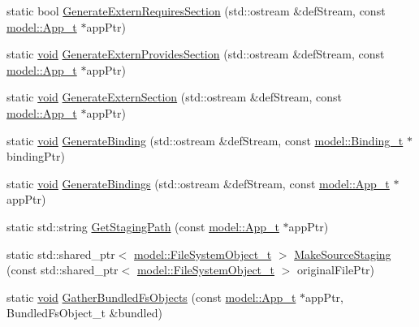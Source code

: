 \begin{DoxyCompactItemize}
\item 
static bool \hyperlink{namespaceadef_gen_abf01ac57a60677828d48fc6922b244d4}{Generate\+Extern\+Requires\+Section} (std\+::ostream \&def\+Stream, const \hyperlink{structmodel_1_1_app__t}{model\+::\+App\+\_\+t} $\ast$app\+Ptr)
\item 
static \hyperlink{_t_e_m_p_l_a_t_e__cdef_8h_ac9c84fa68bbad002983e35ce3663c686}{void} \hyperlink{namespaceadef_gen_aa4781df965e05e2e86f10e072392e974}{Generate\+Extern\+Provides\+Section} (std\+::ostream \&def\+Stream, const \hyperlink{structmodel_1_1_app__t}{model\+::\+App\+\_\+t} $\ast$app\+Ptr)
\item 
static \hyperlink{_t_e_m_p_l_a_t_e__cdef_8h_ac9c84fa68bbad002983e35ce3663c686}{void} \hyperlink{namespaceadef_gen_ab0ee056bd661f18f3481891bab37b5de}{Generate\+Extern\+Section} (std\+::ostream \&def\+Stream, const \hyperlink{structmodel_1_1_app__t}{model\+::\+App\+\_\+t} $\ast$app\+Ptr)
\item 
static \hyperlink{_t_e_m_p_l_a_t_e__cdef_8h_ac9c84fa68bbad002983e35ce3663c686}{void} \hyperlink{namespaceadef_gen_a2cce03d2d48c3eb5053ec7716ccfdd1a}{Generate\+Binding} (std\+::ostream \&def\+Stream, const \hyperlink{structmodel_1_1_binding__t}{model\+::\+Binding\+\_\+t} $\ast$binding\+Ptr)
\item 
static \hyperlink{_t_e_m_p_l_a_t_e__cdef_8h_ac9c84fa68bbad002983e35ce3663c686}{void} \hyperlink{namespaceadef_gen_ad3107120ffe4b07ca0ac5d17589528f7}{Generate\+Bindings} (std\+::ostream \&def\+Stream, const \hyperlink{structmodel_1_1_app__t}{model\+::\+App\+\_\+t} $\ast$app\+Ptr)
\item 
static std\+::string \hyperlink{namespaceadef_gen_a4bf0f5ca5d1c2379b681304d80485135}{Get\+Staging\+Path} (const \hyperlink{structmodel_1_1_app__t}{model\+::\+App\+\_\+t} $\ast$app\+Ptr)
\item 
static std\+::shared\+\_\+ptr$<$ \hyperlink{structmodel_1_1_file_system_object__t}{model\+::\+File\+System\+Object\+\_\+t} $>$ \hyperlink{namespaceadef_gen_a40a2d96a09bd013e4f638a016a68977d}{Make\+Source\+Staging} (const std\+::shared\+\_\+ptr$<$ \hyperlink{structmodel_1_1_file_system_object__t}{model\+::\+File\+System\+Object\+\_\+t} $>$ original\+File\+Ptr)
\item 
static \hyperlink{_t_e_m_p_l_a_t_e__cdef_8h_ac9c84fa68bbad002983e35ce3663c686}{void} \hyperlink{namespaceadef_gen_a84034ccabe4b641e6260115f770f34a6}{Gather\+Bundled\+Fs\+Objects} (const \hyperlink{structmodel_1_1_app__t}{model\+::\+App\+\_\+t} $\ast$app\+Ptr, Bundled\+Fs\+Object\+\_\+t \&bundled)

\end{DoxyCompactItemize}
